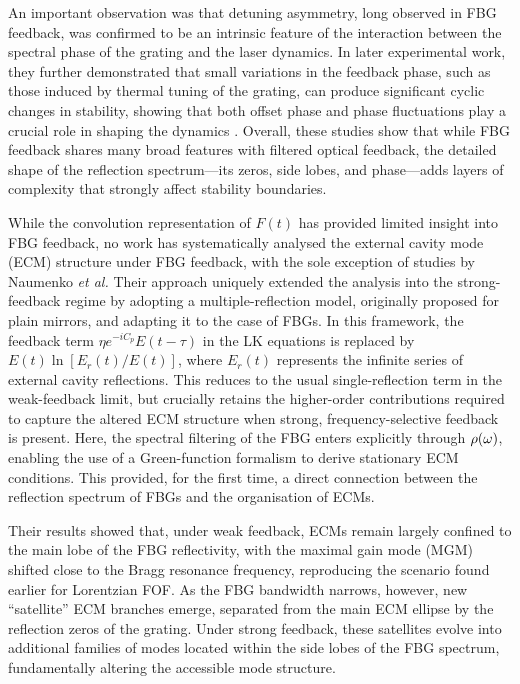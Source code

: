 An important observation was that detuning asymmetry, long observed in FBG feedback, was confirmed to be an intrinsic feature of the interaction between the spectral phase of the grating and the laser dynamics. 
In later experimental work, they further demonstrated that small variations in the feedback phase, such as those induced by thermal tuning of the grating, can produce significant cyclic changes in stability, showing that both offset phase and phase fluctuations play a crucial role in shaping the dynamics \cite{skenderas2024impact}. 
Overall, these studies show that while FBG feedback shares many broad features with filtered optical feedback, the detailed shape of the reflection spectrum—its zeros, side lobes, and phase—adds layers of complexity that strongly affect stability boundaries. 
%
\par
%
While the convolution representation of $F(t)$ has provided limited insight into FBG feedback, no work has systematically analysed the external cavity mode (ECM) structure under FBG feedback, with the sole exception of studies by Naumenko \textit{et al.} \cite{naumenko2003characteristics,naumenko2004slow}
Their approach uniquely extended the analysis into the strong-feedback regime by adopting a multiple-reflection model, originally proposed for plain mirrors, and adapting it to the case of FBGs.
In this framework, the feedback term $\eta e^{-i C_p}E(t-\tau)$ in the LK equations is replaced by $E(t)\ln[E_r(t)/E(t)]$, where $E_r(t)$ represents the infinite series of external cavity reflections.
This reduces to the usual single-reflection term in the weak-feedback limit, but crucially retains the higher-order contributions required to capture the altered ECM structure when strong, frequency-selective feedback is present.
Here, the spectral filtering of the FBG enters explicitly through $\rho(\omega)$, enabling the use of a Green-function formalism to derive stationary ECM conditions.
This provided, for the first time, a direct connection between the reflection spectrum of FBGs and the organisation of ECMs.
%
\par
%
Their results showed that, under weak feedback, ECMs remain largely confined to the main lobe of the FBG reflectivity, with the maximal gain mode (MGM) shifted close to the Bragg resonance frequency, reproducing the scenario found earlier for Lorentzian FOF.
As the FBG bandwidth narrows, however, new “satellite” ECM branches emerge, separated from the main ECM ellipse by the reflection zeros of the grating.
Under strong feedback, these satellites evolve into additional families of modes located within the side lobes of the FBG spectrum, fundamentally altering the accessible mode structure.
